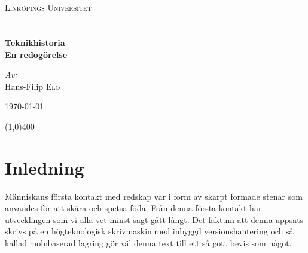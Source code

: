 \documentclass[a4paper,12pt,fleqn]{article}
\begin{document}
\onehalfspacing

\begin{titlepage}
\begin{center}


~\\
~\\
\textsc{\LARGE Link{\"o}pings Universitet}\\[1.5cm]


~\\
~\\
{ \huge \bfseries Teknikhistoria \\ En redogörelse \\[0.4cm] }

\large
\emph{Av:}\\
Hans-Filip \textsc{Elo}

\vfill

{\large \today}

\end{center}


\newpage
\thispagestyle{empty}
\tableofcontents

\begin{center}
\line(1,0){400}
\end{center}

\listoffigures

\end{titlepage}

\pagestyle{fancy}

\fancyhead{} %


\section{Inledning}

Människans första kontakt med redskap var i form av skarpt formade stenar som användes för att skära och spetsa föda. Från denna första kontakt har utvecklingen som vi alla vet minst sagt gått långt. Det faktum att denna uppsats skrivs på en högteknologisk skrivmaskin med inbyggd versionshantering och så kallad molnbaserad lagring gör väl denna text till ett så gott bevis som något. 
\end{document}
